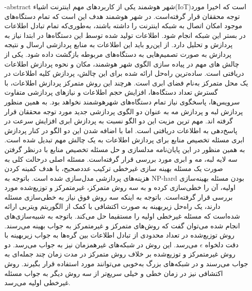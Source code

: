 \fa-abstract{
	شهر هوشمند یکی از کاربردهای مهم اینترنت اشیاء(IoT)است که اخیرا مورد توجه محققان قرار گرفته‌است. در شهر هوشمند هدف این است که تمام دستگاه‌های موجود امکان اتصال به شبکه اینترنت را داشته باشند، به‌طوری‌که تمام تبادل اطلاعات در بستر این شبکه انجام شود. 
	اطلاعات تولید شده توسط این دستگاه‌ها در ابتدا نیاز به پردازش و تحلیل دارد. از این‌رو باید این اطلاعات به منابع پردازشی ارسال و نتیجه پردازش به صورت تصمیم‌هایی به دستگاه‌های مربوطه بازگشت داده شود. 
	یکی از چالش های مهم در پیاده سازی الگوی شهر هوشمند، مکان و نحوه پردازش اطلاعات دریافتی است. ساده‌ترین راه‌حل‌ ارائه شده برای این چالش، پردازش کلیه‌ اطلاعات در یک محل متمرکز به‌نام فضای ابری است. هرچند این روش متمرکز پردازش اطلاعات، با گسترش تعداد دستگاه‌ها، افزایش حجم اطلاعات و نیازهای پردازشی متفاوت سرویس‌ها، پاسخگوی نیاز تمام دستگاه‌های شهرهوشمند نخواهد بود.
	به همین منظور پردازش لبه و پردازش مه به عنوان دو الگوی پردازشی جدید مورد توجه محققان قرار گرفته اند. مهم ترین مزیت این دو الگو نسبت به پردازش ابری افزایش سرعت در پاسخ‌دهی به اطلاعات دریافتی است. اما با اضافه شدن این دو الگو در کنار پردازش ابری مسئله تخصیص منابع برای پردازش اطلاعات به یک چالش مهم تبدیل شده است.
	به همین منظور در این پایان‌نامه مدلسازی و حل مسئله تخصیص منابع با درنظر گرفتن سه لایه لبه، مه و ابری مورد بررسی قرار گرفته‌است. مسئله اصلی درحالت کلی به صورت یک مسئله بهینه سازی غیرخطی ترکیب عددصحیح، با هدف کمینه کردن هزینه‌های پردازشی مدل‌سازی شده است. 
	باتوجه به NP-hard بودن مسئله بهینه‌سازی اولیه، آن را خطی‌سازی کرده و به سه روش متمرکز، غیرمتمرکز و توزیع‌شده مورد بررسی قرار گرفته‌است.
	باتوجه به اینکه سه روش فوق نیاز به خطی‌سازی مسئله دارند، یک راه‌حل زیر‌بهینه به صورت اکتشافی با کمک از الگوریتم ویتربی ارائه شده‌است که مسئله غیرخطی اولیه را مستقیما حل می‌کند.
	باتوجه به شبیه‌سازی‌های انجام شده می‌توان گفت که روش‌های متمرکز و غیرمتمرکز به جواب بهینه می‌رسند. روش توزیع‌شده در تعداد محدودی از تبادل اطلاعات بین گره‌ها به جواب زیر‌بهینه با دقت دلخواه $\epsilon$ می‌رسد. این روش در شبکه‌های غیرهمزمان نیز به جواب می‌رسد. دو روش غیرمتمرکز و توزیع‌شده بر خلاف روش متمرکز در مدت زمان چند جمله‌ای به جواب می‌رسند و در شبکه‌های بزرگ به‌خوبی می‌توانند مورد استفاده قرار بگیرند. روش اکتشافی نیز در زمان خطی و خیلی سریع‌تر از سه روش دیگر به جواب مسئله غیرخطی اولیه می‌رسد.  
}

\cleartorightpage
\abstractPage

\cleartorightpage
